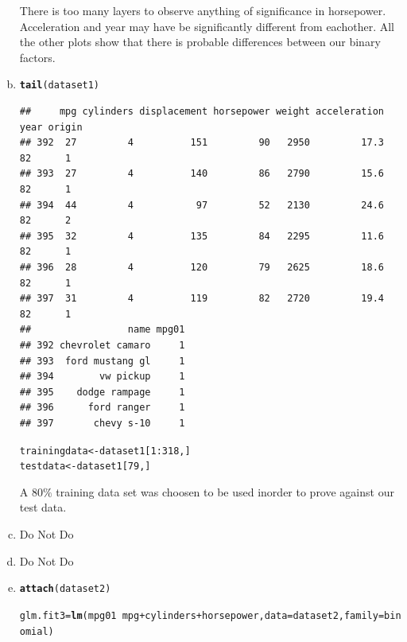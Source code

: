 \documentclass{article}\usepackage[]{graphicx}\usepackage[]{color}
\makeatletter
\newcommand{\hlnum}[1]{\textcolor[rgb]{0.686,0.059,0.569}{#1}}%
\newcommand{\hlopt}[1]{\textcolor[rgb]{0,0,0}{#1}}%
\newcommand{\hlstd}[1]{\textcolor[rgb]{0.345,0.345,0.345}{#1}}%
\newcommand{\hlkwb}[1]{\textcolor[rgb]{0.69,0.353,0.396}{#1}}%
\newcommand{\hlkwc}[1]{\textcolor[rgb]{0.333,0.667,0.333}{#1}}%
\newcommand{\hlkwd}[1]{\textcolor[rgb]{0.737,0.353,0.396}{\textbf{#1}}}%
\newenvironment{kframe}{%
 \def\at@end@of@kframe{}%
 \ifinner\ifhmode%
  \def\at@end@of@kframe{\end{minipage}}%
  \begin{minipage}{\columnwidth}%
 \fi\fi%
 \def\FrameCommand##1{\hskip\@totalleftmargin \hskip-\fboxsep
 \colorbox{shadecolor}{##1}\hskip-\fboxsep
     \hskip-\linewidth \hskip-\@totalleftmargin \hskip\columnwidth}%
 \MakeFramed {\advance\hsize-\width
   \@totalleftmargin\z@ \linewidth\hsize
   \@setminipage}}%
 {\par\unskip\endMakeFramed%
 \at@end@of@kframe}
\newenvironment{knitrout}{}{} %
\makeatother
\begin{document}
\begin{enumerate}[(a)]
There is too many layers to observe anything of significance in horsepower. Acceleration and year may have be significantly different from eachother. All the other plots show that there is probable differences between our binary factors.
\item
\begin{knitrout}
\color{fgcolor}\begin{kframe}
\begin{alltt}
\hlkwd{tail}\hlstd{(dataset1)}
\end{alltt}
\begin{verbatim}
##     mpg cylinders displacement horsepower weight acceleration year origin
## 392  27         4          151         90   2950         17.3   82      1
## 393  27         4          140         86   2790         15.6   82      1
## 394  44         4           97         52   2130         24.6   82      2
## 395  32         4          135         84   2295         11.6   82      1
## 396  28         4          120         79   2625         18.6   82      1
## 397  31         4          119         82   2720         19.4   82      1
##                 name mpg01
## 392 chevrolet camaro     1
## 393  ford mustang gl     1
## 394        vw pickup     1
## 395    dodge rampage     1
## 396      ford ranger     1
## 397       chevy s-10     1
\end{verbatim}
\begin{alltt}
\hlstd{trainingdata}\hlkwb{<-}\hlstd{dataset1[}\hlnum{1}\hlopt{:}\hlnum{318}\hlstd{,]}
\hlstd{testdata}\hlkwb{<-}\hlstd{dataset1[}\hlnum{79}\hlstd{,]}
\end{alltt}
\end{kframe}
\end{knitrout}
A $80\%$ training data set was choosen to be used inorder to prove against our test data.

\item
Do Not Do
\item
Do Not Do
\item
\begin{knitrout}
\color{fgcolor}\begin{kframe}
\begin{alltt}
\hlkwd{attach}\hlstd{(dataset2)}
\end{alltt}


{\ttfamily\noindent\itshape\color{messagecolor}{\#\# The following object is masked from package:ggplot2:\\\#\# \\\#\#\ \ \ \  mpg}}\begin{alltt}
\hlstd{glm.fit3}\hlkwb{=}\hlkwd{lm}\hlstd{(mpg01}\hlopt{~}\hlstd{mpg}\hlopt{+}\hlstd{cylinders}\hlopt{+}\hlstd{horsepower,}\hlkwc{data}\hlstd{=dataset2,} \hlkwc{family} \hlstd{= binomial)}
\end{alltt}



\end{kframe}
\end{knitrout}
\end{enumerate}
\end{document}
